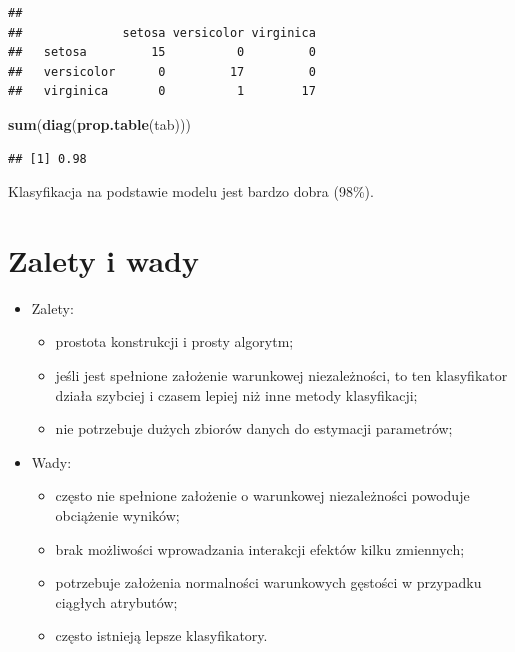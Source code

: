 \documentclass[
]{book}
\newenvironment{Shaded}{\begin{snugshade}}{\end{snugshade}}
\newcommand{\AttributeTok}[1]{\textcolor[rgb]{0.13,0.29,0.53}{#1}}
\newcommand{\FunctionTok}[1]{\textcolor[rgb]{0.13,0.29,0.53}{\textbf{#1}}}
\newcommand{\NormalTok}[1]{#1}
\newcommand{\OtherTok}[1]{\textcolor[rgb]{0.56,0.35,0.01}{#1}}
\newcommand{\SpecialCharTok}[1]{\textcolor[rgb]{0.81,0.36,0.00}{\textbf{#1}}}
\providecommand{\tightlist}{%
  \setlength{\itemsep}{0pt}\setlength{\parskip}{0pt}}
\theoremstyle{plain}
\theoremstyle{definition}
\theoremstyle{definition}
\theoremstyle{definition}
\theoremstyle{definition}
\theoremstyle{definition}
\theoremstyle{remark}
\begin{document}
\begin{Shaded}
\end{Shaded}

\begin{verbatim}
##             
##              setosa versicolor virginica
##   setosa         15          0         0
##   versicolor      0         17         0
##   virginica       0          1        17
\end{verbatim}

\begin{Shaded}
\begin{Highlighting}[]
\FunctionTok{sum}\NormalTok{(}\FunctionTok{diag}\NormalTok{(}\FunctionTok{prop.table}\NormalTok{(tab)))}
\end{Highlighting}
\end{Shaded}

\begin{verbatim}
## [1] 0.98
\end{verbatim}

Klasyfikacja na podstawie modelu jest bardzo dobra (98\%).

\section{Zalety i wady}\label{zalety-i-wady-1}

\begin{itemize}
\tightlist
\item
  Zalety:

  \begin{itemize}
  \tightlist
  \item
    prostota konstrukcji i prosty algorytm;
  \item
    jeśli jest spełnione założenie warunkowej niezależności, to ten klasyfikator działa szybciej i czasem lepiej niż inne metody klasyfikacji;
  \item
    nie potrzebuje dużych zbiorów danych do estymacji parametrów;
  \end{itemize}
\item
  Wady:

  \begin{itemize}
  \tightlist
  \item
    często nie spełnione założenie o warunkowej niezależności powoduje obciążenie wyników;
  \item
    brak możliwości wprowadzania interakcji efektów kilku zmiennych;
  \item
    potrzebuje założenia normalności warunkowych gęstości w przypadku ciągłych atrybutów;
  \item
    często istnieją lepsze klasyfikatory.
  \end{itemize}
\end{itemize}
\end{document}
